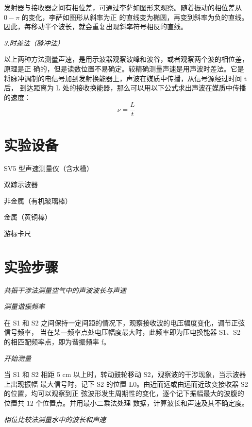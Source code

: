 \documentclass[UTF8]{ctexart}
\begin{document}
    发射器与接收器之间有相位差，可通过李萨如图形来观察。随着振动的相位差从 $0-\pi $ 的变化，李萨如图形从斜率为正
    的直线变为椭圆，再变到斜率为负的直线。因此，每移动半个波长，就会重复出现斜率符号相反的直线。
    
    \emph{3.时差法（脉冲法）}

    以上两种方法测量声速，是用示波器观察波峰和波谷，或者观察两个波的相位差，原理是正
确的，但是读数位置不易确定。较精确测量声速是用声波时差法。它是将脉冲调制的电信号加到发射换能器上，声波在媒质中传播，从信号源经过时间 t 后，
到达距离为 L 处的接收换能器，那么可以用以下公式求出声波在媒质中传播的速度：
\begin{equation}
    \nu =\frac{L}{t}
\end{equation}


    \section{实验设备}

     SV5 型声速测量仪（含水槽）
     
     双踪示波器

     非金属（有机玻璃棒）

    金属（黄铜棒）

    游标卡尺

    \section{实验步骤}

    \begin{center}
        \emph{共振干涉法测量空气中的声波波长与声速}\\[0.4cm]
    \end{center}
    
    \emph{测量谐振频率}

    在 S1 和 S2 之间保持一定间距的情况下，观察接收波的电压幅度变化，调节正弦信号频率，
    当在某一频率点处电压幅度最大时，此频率即为压电换能器 S1、S2 的相匹配频率点，即为谐振频率 f。

    \emph{开始测量}

    当 S1 和 S2 相距 5 cm 以上时，转动鼓轮移动 S2，观察波的干涉现象，当示波器上出现振幅
   最大信号时，记下 S2 的位置 L0。由近而远或由远而近改变接收器 S2 的位置，均可以观察到正
   弦波形发生周期性的变化，逐个记下振幅最大的波腹的位置共 12 个位置点。并用最小二乘法处理
   数据，计算波长和声速及其不确定度。

    \begin{center}
        \emph{相位比较法测量水中的波长和声速}\\[0.4cm]
    \end{center} 
    
\end{document}
